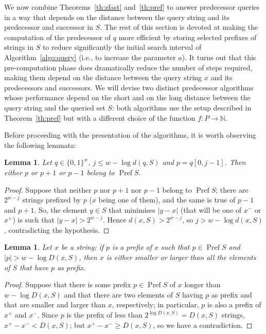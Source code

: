 \documentclass[a4paper,11pt]{article}
\newtheorem{lemma}[theorem]{Lemma}
\newcommand{\N}{\mathbb{N}}
\newcommand{\?}{\mskip1.5mu}
\DeclareMathOperator{\Pref}{Pref}
\begin{document}
We now combine Theorems~\ref{th:zfast} and~\ref{th:pref} to answer
predecessor queries in a way that depends on the distance
between the query string and its predecessor and successor in $S$. 
The rest of this section is devoted at making the computation of the
predecessor of $q$  more efficient by storing selected prefixes 
of strings in $S$ 
to reduce significantly the initial search interval of
Algorithm~\ref{algo:query} (i.e., to increase the parameter $a$).
It turns out that this pre-computation phase does dramatically reduce the number
of steps required, making them depend on the distance between the query string
$x$ and its predecessors and successors. 
We will devise two
distinct predecessor algorithms whose performance depend on the short and on the
long distance between the query string and the queried set $S$:
both algorithms use the setup described in Theorem~\ref{th:pref} but with a
different choice of the function $f:P\to \N$. 


Before proceeding with the presentation of the algorithms, it is 
worth observing the following lemmata:
\begin{lemma}
\label{lemma:hitpref}
Let $q \in \{0, 1\}^w$, $j \leq w-\log d(q,S)$ and $p=q[0,j - 1]$. 
Then either $p$ or $p+1$ or $p-1$ belong to $\Pref S$. 
\end{lemma}

\begin{proof}
Suppose that neither $p$ nor $p+1$ nor $p-1$ belong to $\Pref S$; 
there are $2^{w-j}$ strings prefixed by $p$ ($x$ being one of them), and the same is true
of $p-1$ and $p+1$. So, the element $y \in S$ that minimises $|y-x|$ (that will be one
of $x^-$ or $x^+$) is such that $|y-x|>2^{w-j}$. Hence $d(x,S)>2^{w-j}$, so
$j>w-\log d(x,S)$, contradicting the hypothesis.
\end{proof}
\begin{lemma}
\label{lemma:shortinprefs}
Let $x$ be a string; if $p$ is a prefix of $x$ such that $p \in \Pref S$ and
	$|p|>w-\log D(x,S)$, then $x$ is either smaller or larger than all the
	elements of $S$ that have $p$ as prefix.
\end{lemma}
\begin{proof}
Suppose that there is some prefix $p\in \Pref S$ of $x$ longer than $w-\log
D(x,S)$ and that there are two elements of $S$ having $p$ as prefix and that
are smaller and larger than $x$, respectively; in particular, $p$ is also a
prefix of $x^+$ and $x^-$. Since $p$ is the prefix of less than $2^{\log D(x,S)}=D(x,S)$ strings, $x^+-x^-<D(x,S)$; but $x^+-x^-\geq D(x,S)$, so we have a contradiction.
\end{proof}
\end{document}
